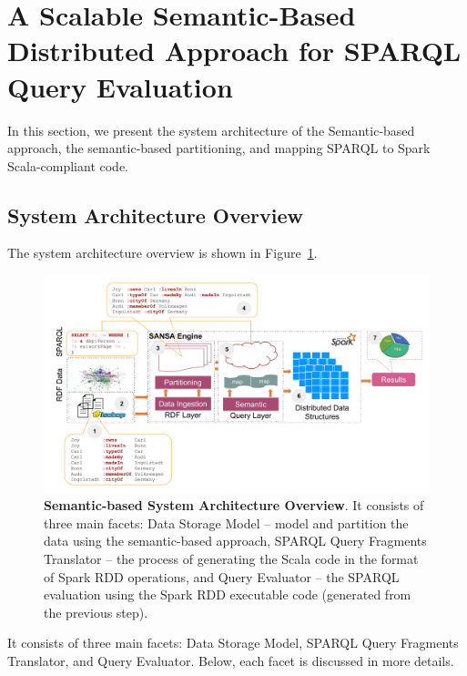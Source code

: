 
\section{A Scalable Semantic-Based Distributed Approach for SPARQL Query Evaluation}
\label{sec:semantic-based-approach}
In this section, we present the system architecture of the Semantic-based approach, the semantic-based partitioning, and mapping \gls{SPARQL} to Spark Scala-compliant code.

\subsection{System Architecture Overview}
The system architecture overview is shown in Figure~\ref{fig:semantic-based-architecture}.

\begin{figure}
\centering
\includegraphics[width=1.0\columnwidth]{images/6_scalable_rdf_querying/semantic-based-architecture.pdf}
\caption{\textbf{Semantic-based System Architecture Overview}.
It consists of three main facets: Data Storage Model -- model and partition the data using the semantic-based approach, SPARQL Query Fragments Translator -- the process of generating the Scala code in the format of Spark RDD operations, and Query Evaluator -- the SPARQL evaluation using the Spark RDD executable code (generated from the previous step).}
\label{fig:semantic-based-architecture}
\end{figure}

It consists of three main facets: Data Storage Model, \gls{SPARQL} Query Fragments Translator, and Query Evaluator.
Below, each facet is discussed in more details.

